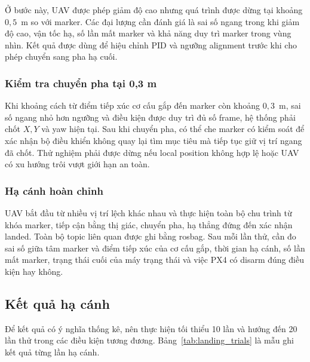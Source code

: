 Ở bước này, UAV được phép giảm độ cao nhưng quá trình được dừng tại khoảng $0{,}5$~m so với marker. Các đại lượng cần đánh giá là sai số ngang trong khi giảm độ cao, vận tốc hạ, số lần mất marker và khả năng duy trì marker trong vùng nhìn. Kết quả được dùng để hiệu chỉnh PID và ngưỡng alignment trước khi cho phép chuyển sang pha hạ cuối.

\subsubsection{Kiểm tra chuyển pha tại 0,3 m}

Khi khoảng cách từ điểm tiếp xúc cơ cấu gắp đến marker còn khoảng $0{,}3$~m, sai số ngang nhỏ hơn ngưỡng và điều kiện được duy trì đủ số frame, hệ thống phải chốt $X,Y$ và yaw hiện tại. Sau khi chuyển pha, có thể che marker có kiểm soát để xác nhận bộ điều khiển không quay lại tìm mục tiêu mà tiếp tục giữ vị trí ngang đã chốt. Thử nghiệm phải được dừng nếu local position không hợp lệ hoặc UAV có xu hướng trôi vượt giới hạn an toàn.

\subsubsection{Hạ cánh hoàn chỉnh}

UAV bắt đầu từ nhiều vị trí lệch khác nhau và thực hiện toàn bộ chu trình từ khóa marker, tiếp cận bằng thị giác, chuyển pha, hạ thẳng đứng đến xác nhận landed. Toàn bộ topic liên quan được ghi bằng rosbag. Sau mỗi lần thử, cần đo sai số giữa tâm marker và điểm tiếp xúc của cơ cấu gắp, thời gian hạ cánh, số lần mất marker, trạng thái cuối của máy trạng thái và việc PX4 có disarm đúng điều kiện hay không.

\subsection{Kết quả hạ cánh}

Để kết quả có ý nghĩa thống kê, nên thực hiện tối thiểu 10 lần và hướng đến 20 lần thử trong các điều kiện tương đương. Bảng~\ref{tab:landing_trials} là mẫu ghi kết quả từng lần hạ cánh.

